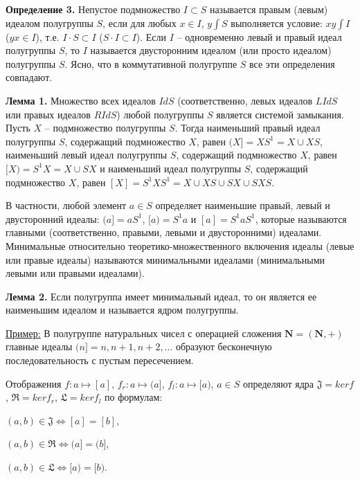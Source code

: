 \documentclass[bachelor, och, labwork]{shiza}
\begin{document}
    \textbf{Определение 3.} Непустое подмножество $I \subset S$ называется правым (левым) идеалом полугруппы $S$,
    если для любых $x \in I$, $y \int S$ выполняется условие: $xy \int I$ ($yx \in I$), т.е. $I \cdot S \subset I$ ($S \cdot I \subset I$).
    Если $I$ -- одновременно левый и правый идеал полугруппы $S$, то $I$ называется двусторонним идеалом (или просто идеалом) полугруппы
    $S$. Ясно, что в коммутативной полугруппе $S$ все эти определения совпадают.

    \textbf{Лемма 1.} Множество всех идеалов $Id S$  (соответственно, левых идеалов $LId S$  или правых идеалов $RId S$) любой
    полугруппы $S$ является системой замыкания. Пусть $X$ -- подмножество полугруппы $S$. Тогда наименьший правый идеал 
    полугруппы $S$, содержащий подмножество $X$, равен $(X] = XS^1 = X \cup XS$, наименьший левый идеал полугруппы $S$, содержащий
    подмножество $X$, равен $[X) = S^1X = X \cup SX$  и наименьший идеал полугруппы $S$, содержащий подмножество $X$, равен 
    $[X] = S^1XS^1 = X \cup XS \cup SX \cup SXS$.
    
    В частности, любой элемент $a \in S$ определяет наименьшие правый, левый и двусторонний идеалы: $(a] = aS^1$, $[a) = S^1a$ и
    $[a] = S^1aS^1$, которые называются главными (соответственно, правыми, левыми и двусторонними) идеалами.
    Минимальные относительно теоретико-множественного включения идеалы (левые или правые идеалы) называются минимальными идеалами
    (минимальными левыми или правыми идеалами).
    
    \textbf{Лемма 2.} Если полугруппа имеет минимальный идеал, то он является ее наименьшим идеалом и называется ядром полугруппы.

    \underline{Пример:} В полугруппе натуральных чисел с операцией сложения $\textbf{N} = (\textbf{N}, +)$ главные идеалы 
    $(n] = {n, n + 1, n + 2, \dots}$ образуют бесконечную последовательность с пустым пересечением.

    \begin{center}
      Отображения $f: a \mapsto [a]$, $f_r: a \mapsto (a]$, $f_l: a \mapsto [a)$, $a \in S$ определяют ядра $\mathfrak{J} = ker f$,
      $\mathfrak{R} = ker f_r$, $\mathfrak{L} = ker f_l$ по формулам:

      $(a, b) \in \mathfrak{J} \Longleftrightarrow [a] = [b]$,

      $(a, b) \in \mathfrak{R} \Longleftrightarrow (a] = (b]$,

      $(a, b) \in \mathfrak{L} \Longleftrightarrow [a) = [b)$.
    \end{center}
\end{document}
